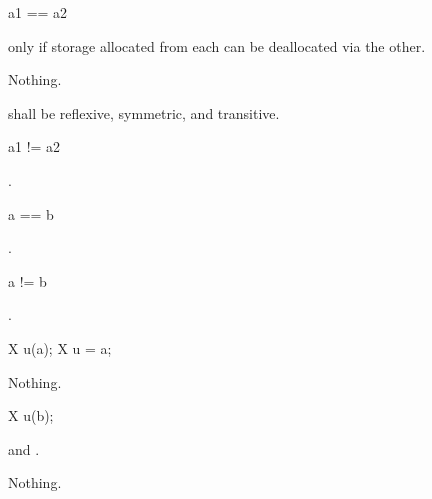 \begin{itemdecl}
a1 == a2
\end{itemdecl}

\begin{itemdescr}
\pnum
\result
{}

\pnum
\returns
{} only if storage allocated from each can
be deallocated via the other.

\pnum
\throws
Nothing.

\pnum
\remarks
{} shall be reflexive, symmetric,
and transitive.
\end{itemdescr}

\begin{itemdecl}
a1 != a2
\end{itemdecl}

\begin{itemdescr}
\pnum
\result
{}

\pnum
\returns
{}.
\end{itemdescr}

\begin{itemdecl}
a == b
\end{itemdecl}

\begin{itemdescr}
\pnum
\result
{}

\pnum
\returns
{}.
\end{itemdescr}

\begin{itemdecl}
a != b
\end{itemdecl}

\begin{itemdescr}
\pnum
\result
{}

\pnum
\returns
{}.
\end{itemdescr}

\begin{itemdecl}
X u(a);
X u = a;
\end{itemdecl}

\begin{itemdescr}
\pnum
\ensures
{}

\pnum
\throws
Nothing.
\end{itemdescr}

\begin{itemdecl}
X u(b);
\end{itemdecl}

\begin{itemdescr}
\pnum
\ensures
{} and .

\pnum
\throws
Nothing.
\end{itemdescr}

